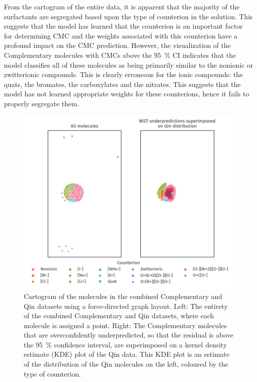 From the cartogram of the entire data, it is apparent that the majority of the
surfactants are segregated based upon the type of counterion in the solution.
This suggests that the model has learned that the counterion is an important
factor for determining CMC and the weights associated with this counterion have
a profound impact on the CMC prediction. However, the visualization of the Complementary
molecules with CMCs above the \SI{95}{\%} CI indicates that the model classifies
all of these molecules as being primarily similar to the nonionic or
zwitterionic compounds. This is clearly erroneous for the ionic compounds: the
quats, the bromates, the carboxylates and the nitrates. This suggests that the
model has not learned appropriate weights for these counterions, hence it fails
to properly segregate them.

\begin{figure}
    \includegraphics[width=\textwidth]{images/force-graph.pdf}
    \caption{Cartogram of the molecules in the combined Complementary and Qin datasets
        using a force-directed graph layout. Left: The entirety of the combined
        Complementary and Qin datasets, where each molecule is assigned a point. Right:
        The Complementary molecules that are overconfidently underpredicted, so that the
        residual is above the \SI{95}{\%} confidence interval, are superimposed
        on a kernel density estimate (KDE) plot of the Qin data. This KDE plot
        is an estimate of the distribution of the Qin molecules on the left,
        coloured by the type of counterion.}
    \label{fig:fdg}
\end{figure}

